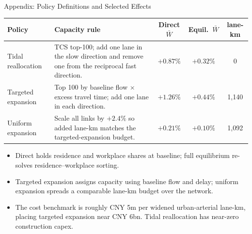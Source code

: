 \documentclass[11pt,aspectratio=169]{beamer}
\newcommand{\navback}[1]{\par\vspace{0.35em}\noindent\hfill\hyperlink{#1}{\beamerreturnbutton{back}}}
\begin{document}
\begin{frame}[label=apppolicy]{Appendix: Policy Definitions and Selected Effects}
\scriptsize
\begin{center}
\renewcommand{\arraystretch}{1.20}
\begin{tabularx}{0.96\textwidth}{@{}p{}Xccc@{}}
\toprule
Policy & Capacity rule & Direct $\bar W$ & Equil.\ $\bar W$ & lane-km \\
\midrule
Tidal reallocation & TCS top-100; add one lane in the slow direction and remove one from the reciprocal fast direction. & $+0.87\%$ & $+0.32\%$ & 0 \\
Targeted expansion & Top 100 by baseline flow $\times$ excess travel time; add one lane in each direction. & $+1.26\%$ & $+0.44\%$ & 1{,}140 \\
Uniform expansion & Scale all links by $+2.4\%$ so added lane-km matches the targeted-expansion budget. & $+0.21\%$ & $+0.10\%$ & 1{,}092 \\
\bottomrule
\end{tabularx}
\end{center}
\vspace{0.35em}
\begin{itemize}\footnotesize\setlength\itemsep{0.40em}
  \item Direct holds residence and workplace shares at baseline; full equilibrium re-solves residence--workplace sorting.
  \item Targeted expansion assigns capacity using baseline flow and delay; uniform expansion spreads a comparable lane-km budget over the network.
  \item The cost benchmark is roughly CNY 5m per widened urban-arterial lane-km, placing targeted expansion near CNY 6bn. Tidal reallocation has near-zero construction capex.
\end{itemize}
\navback{result4}
\end{frame}
\end{document}
